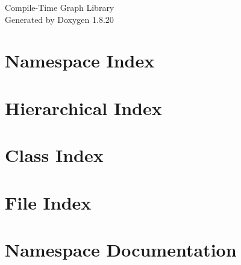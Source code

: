 \let\mypdfximage\pdfximage\def\pdfximage{\immediate\mypdfximage}\documentclass[twoside]{book}
\newcommand{\+}{\discretionary{\mbox{\scriptsize$\hookleftarrow$}}{}{}}
\newcommand{\clearemptydoublepage}{%
  \newpage{\pagestyle{empty}\cleardoublepage}%
}
\begin{document}
\hypersetup{pageanchor=false,
             bookmarksnumbered=true,
             pdfencoding=unicode
            }
\begin{titlepage}
\vspace*{7cm}
\begin{center}%
{\Large Compile-\/\+Time Graph Library }\\
\vspace*{1cm}
{\large Generated by Doxygen 1.8.20}\\
\end{center}
\end{titlepage}
\clearemptydoublepage
{}
\tableofcontents
\clearemptydoublepage
{}
\hypersetup{pageanchor=true}

\chapter{Namespace Index}

\chapter{Hierarchical Index}

\chapter{Class Index}

\chapter{File Index}

\chapter{Namespace Documentation}




\end{document}
